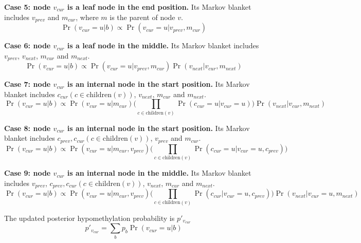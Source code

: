 \documentclass[11pt]{article}
\begin{document}
\textbf{Case 5: node $v_{cur}$ is a leaf node in the end position.}
Its Markov blanket includes $v_{prev}$ and $m_{cur}$, where
$m$ is the parent of node $v$.
\begin{equation*}
\Pr(v_{cur} = u|b)\propto \Pr(v_{cur} = u| v_{prev}, m_{cur})
\end{equation*}

\textbf{Case 6: node $v_{cur}$ is a leaf node in the middle.}
Its Markov blanket includes $v_{prev}$, $v_{next}$, $m_{cur}$ and $m_{next}$.
\begin{equation*}
\Pr(v_{cur} = u|b)\propto \Pr(v_{cur} = u| v_{prev}, m_{cur})  \Pr(v_{next}| v_{cur}, m_{next})
\end{equation*}

\textbf{Case 7: node $v_{cur}$ is an internal node in the start position.}
Its Markov blanket includes $c_{cur} (c\in \text{children}(v))$, $v_{next}$, $m_{cur}$ and $m_{next}$.
\begin{equation*}
\Pr(v_{cur} = u|b)\propto \Pr(v_{cur} = u| m_{cur}) \big(\prod_{c\in \text{children}(v)} \Pr(c_{cur} = u| v_{cur}=u)\big) \Pr(v_{next}| v_{cur}, m_{next})
\end{equation*}

\textbf{Case 8: node $v_{cur}$ is an internal node in the start position.}
Its Markov blanket includes $c_{prev}, c_{cur} (c\in \text{children}(v))$, $v_{prev}$ and $m_{cur}$.
\begin{equation*}
\Pr(v_{cur} = u|b)\propto \Pr(v_{cur} = u| m_{cur}, v_{prev}) \big(\prod_{c\in \text{children}(v)} \Pr(c_{cur} = u| v_{cur}=u, c_{prev})\big)
\end{equation*}

\textbf{Case 9: node $v_{cur}$ is an internal node in the middle.}
Its Markov blanket includes $v_{prev}$, $c_{prev}, c_{cur} (c\in \text{children}(v))$, $v_{next}$, $m_{cur}$ and $m_{next}$.
\begin{equation*}
\Pr(v_{cur} = u|b) \propto \Pr(v_{cur} = u| m_{cur}, v_{prev}) \big(\prod_{c\in \text{children}(v)} \Pr(c_{cur}| v_{cur}=u, c_{prev})\big)\Pr(v_{next} | v_{cur}=u, m_{next})
\end{equation*}

The updated posterior hypomethylation probability is $p'_{v_{cur}}$
$$ p'_{v_{cur}} = \sum_{b}p_{b}\Pr(v_{cur} = u| b)$$




\end{document}
